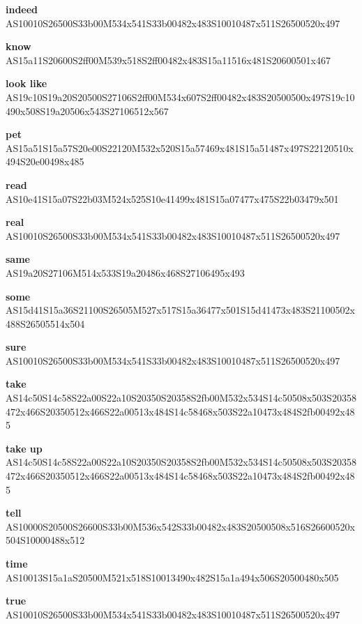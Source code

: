 \documentclass{article}
\begin{document}
\begin{glossary}
\textbf{indeed}\\
AS10010S26500S33b00M534x541S33b00482x483S10010487x511S26500520x497

\textbf{know}\\
AS15a11S20600S2ff00M539x518S2ff00482x483S15a11516x481S20600501x467

\textbf{look like}\\
AS19c10S19a20S20500S27106S2ff00M534x607S2ff00482x483S20500500x497S19c10490x508S19a20506x543S27106512x567

\textbf{pet}\\
AS15a51S15a57S20e00S22120M532x520S15a57469x481S15a51487x497S22120510x494S20e00498x485

\textbf{read}\\
AS10e41S15a07S22b03M524x525S10e41499x481S15a07477x475S22b03479x501

\textbf{real}\\
AS10010S26500S33b00M534x541S33b00482x483S10010487x511S26500520x497

\textbf{same}\\
AS19a20S27106M514x533S19a20486x468S27106495x493

\textbf{some}\\
AS15d41S15a36S21100S26505M527x517S15a36477x501S15d41473x483S21100502x488S26505514x504

\textbf{sure}\\
AS10010S26500S33b00M534x541S33b00482x483S10010487x511S26500520x497

\textbf{take}\\
AS14c50S14c58S22a00S22a10S20350S20358S2fb00M532x534S14c50508x503S20358472x466S20350512x466S22a00513x484S14c58468x503S22a10473x484S2fb00492x485

\textbf{take up}\\
AS14c50S14c58S22a00S22a10S20350S20358S2fb00M532x534S14c50508x503S20358472x466S20350512x466S22a00513x484S14c58468x503S22a10473x484S2fb00492x485

\textbf{tell}\\
AS10000S20500S26600S33b00M536x542S33b00482x483S20500508x516S26600520x504S10000488x512

\textbf{time}\\
AS10013S15a1aS20500M521x518S10013490x482S15a1a494x506S20500480x505

\textbf{true}\\
AS10010S26500S33b00M534x541S33b00482x483S10010487x511S26500520x497

\end{glossary}
\end{document}
